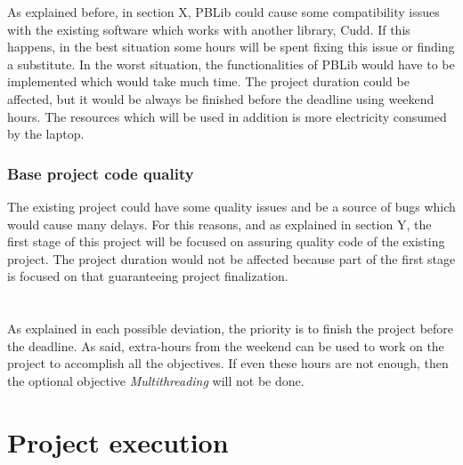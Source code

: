As explained before, in section X, PBLib could cause some compatibility issues with the existing software which works with another library, Cudd. 
If this happens, in the best situation some hours will be spent fixing this issue or finding a substitute. In the worst situation, the functionalities of PBLib would have to be implemented which would take much time. The project duration could be affected, but it would be always be finished before the deadline using weekend hours. The resources which will be used in addition is more electricity consumed by the laptop.

\subsubsection{Base project code quality}
The existing project could have some quality issues and be a source of bugs which would cause many delays. For this reasons, and as explained in section Y, the first stage of this project will be focused on assuring quality code of the existing project.  The project duration would not be affected because part of the first stage is focused on that guaranteeing project finalization.\\\\\\

As explained in each possible deviation, the priority is to finish the project before the deadline.  As said, extra-hours from the weekend can be used to work on the project to accomplish all the objectives. If even these hours are not enough, then the optional objective \emph{Multithreading} will not be done. 

\section{Project execution}%